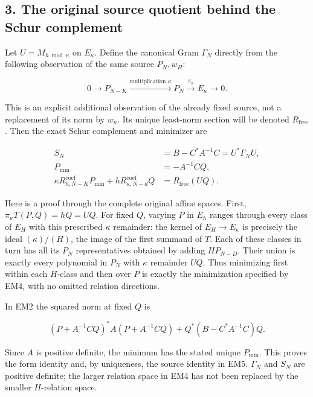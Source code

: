 \subsection{3. The original source quotient behind the Schur complement}\label{the-original-source-quotient-behind-the-schur-complement}

Let \(U=M_{h\bmod\kappa}\) on \(E_\kappa\). Define the canonical Gram \(\Gamma_N\)
directly from the following observation of the same source \(P_N,w_H\):

\[
0\longrightarrow P_{N-K}\xrightarrow{\text{multiplication }\kappa}P_N\xrightarrow{\pi_\kappa}E_\kappa\longrightarrow0.\tag{EM4}
\]

This is an explicit additional observation of the already fixed source,
not a replacement of its norm by \(w_\kappa\). Its unique least-norm section
will be denoted \(R_{\mathrm{free}}\). Then the exact Schur complement and minimizer are

\[
\begin{aligned}S_N&=B-C^*A^{-1}C=U^*\Gamma_NU,\\P_{\min}&=-A^{-1}CQ,\\\kappa R_{h,N-K}^{\mathrm{coef}}P_{\min}+hR_{\kappa,N-d}^{\mathrm{coef}}Q&=R_{\mathrm{free}}(UQ).\end{aligned}\tag{EM5}
\]

Here is a proof through the complete original affine spaces. First,
\(\pi_\kappa T(P,Q)=hQ=UQ\). For fixed \(Q\), varying \(P\) in \(E_h\) ranges through
every class of \(E_H\) with this prescribed \(\kappa\) remainder: the kernel
of \(E_H\longrightarrow E_\kappa\) is precisely the ideal \((\kappa)/(H)\), the image of
the first summand of \(T\). Each of these classes in turn has all its
\(P_N\) representatives obtained by adding \(HP_{N-D}\). Their union is
exactly every polynomial in \(P_N\) with \(\kappa\) remainder \(UQ\). Thus minimizing
first within each \(H\)-class and then over \(P\) is exactly the minimization
specified by EM4, with no omitted relation directions.

In EM2 the squared norm at fixed \(Q\) is

\[
(P+A^{-1}CQ)^*A(P+A^{-1}CQ)+Q^*(B-C^*A^{-1}C)Q.
\]

Since \(A\) is positive definite, the minimum has the stated unique \(P_{\min}\).
This proves the form identity and, by uniqueness, the source identity in
EM5. \(\Gamma_N\) and \(S_N\) are positive definite; the larger relation space in
EM4 has not been replaced by the smaller \(H\)-relation space.

